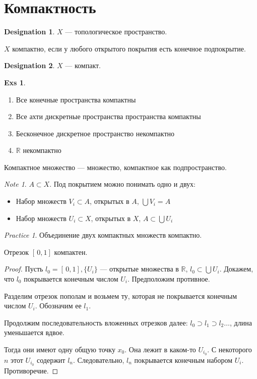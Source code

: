\documentclass[11pt]{book}
\newcommand{\R}{\mathbb{R}}
\theoremstyle{definition}
\theoremstyle{plain}
\theoremstyle{plain}
\theoremstyle{definition}
\newtheorem*{exs}{Exs}
\newtheorem*{name}{Designation}
\theoremstyle{remark}
\newtheorem*{note}{Note}
\newtheorem*{prac}{Practice}
\begin{document}
\section{Компактность}
\begin{name}
    $ X$ ---  топологическое пространство.
\end{name}
\begin{defn}
    $ X$ компактно, если у любого открытого покрытия есть конечное подпокрытие.
    \begin{name}
	$ X$ --- компакт.
    \end{name}
\end{defn}
\begin{exs}
    $ $
    \begin{enumerate}
	\item Все конечные пространства компактны
	\item Все ахти дискретные пространства пространства компактны
	\item Бесконечное дискретное пространство некомпактно
	\item $ \R$ некомпактно
    \end{enumerate}
\end{exs}
\begin{defn}
    Компактное множество --- множество, компактное как подпространство.
\end{defn}
\begin{note}
    $ A \subset X$. Под покрытием можно понимать одно и двух:
    \begin{itemize}
	\item Набор множеств $ V_i \subset A$, открытых в $ A$,  $ \bigcup V_i = A$
	\item Набор множеств $ U_i \subset X$, открытых в $ X$,  $ A \subset \bigcup U_i $
    \end{itemize}
\end{note}
\begin{prac}
    Объединение двух компактных множеств компактно.
\end{prac}
\begin{thm}
    Отрезок $ [\,0,1]$ компактен.
\end{thm}
\begin{proof}
    Пусть $ l_0 = [\,0, 1], \{U_i\}$ --- открытые множества в $ \R$, $l_0 \subset  \bigcup U_i$. Докажем, что $ l_0$ покрывается конечным числом $ U_i$. Предположим противное.

    Разделим отрезок пополам и возьмем ту, которая не покрывается конечным числом  $ U_i$. Обозначим ее  $ l_1$.

    Продолжим последовательность вложенных отрезков далее: $ l_0 \supset l_1 \supset l_2 \ldots $, длина уменьшается вдвое.

    Тогда они имеют одну общую точку $ x_0$. Она лежит в каком-то $ U_{i_0}$. С некоторого $ n$ этот  $ U_{i_0}$ содержит $ l_n$. Следовательно,  $ l_n$ покрывается конечным набором  $ U_i$.  Противоречие.
\end{proof}
\end{document}
